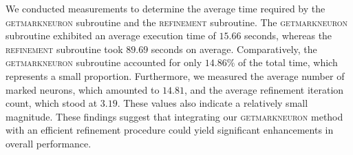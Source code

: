 We conducted measurements to determine the average time required by the \textsc{getmarkneuron} subroutine 
and the \textsc{refinement} subroutine. 
The \textsc{getmarkneuron} subroutine exhibited an average execution time of $15.66$ seconds, 
whereas the \textsc{refinement} subroutine took $89.69$ seconds on average. 
Comparatively, the \textsc{getmarkneuron} subroutine accounted for only $14.86\%$ of the total time, 
which represents a small proportion. Furthermore, we measured the average number of marked neurons, 
which amounted to $14.81$, and the average refinement iteration count, which stood at $3.19$. 
These values also indicate a relatively small magnitude. 
These findings suggest that integrating our \textsc{getmarkneuron} method with an efficient refinement 
procedure could yield significant enhancements in overall performance.










